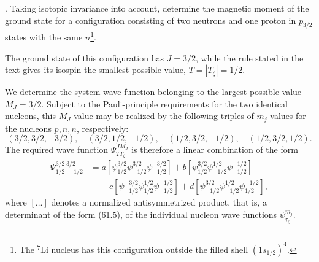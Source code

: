 . Taking isotopic invariance into account, determine the
magnetic moment of the ground state for a configuration consisting of two
neutrons and one proton in $p_{3/2}$ states with the same
$n$\footnote{The ${}^{7}\mathrm{Li}$ nucleus has this configuration outside
the filled shell $(1s_{1/2})^4$.}.

\SolutionHeading The ground state of this configuration has
$J=3/2$, while the rule stated in the text gives its isospin the smallest
possible value, $T=|T_\zeta|=1/2$.

We determine the system wave function belonging to the largest possible value
$M_J=3/2$. Subject to the Pauli-principle requirements for the two identical
nucleons, this $M_J$ value may be realized by the following triples of $m_j$
values for the nucleons $p,n,n$, respectively:
\[
 (3/2,3/2,-3/2),\quad(3/2,1/2,-1/2),\quad
 (1/2,3/2,-1/2),\quad(1/2,3/2,1/2).
\]
The required wave function $\Psi^{JM_J}_{TT_\zeta}$ is therefore a linear
combination of the form
\begin{equation}
 \begin{split}
 \Psi^{3/2\;3/2}_{1/2\;-1/2}
 &=a[\psi^{3/2}_{1/2}\psi^{3/2}_{-1/2}\psi^{-3/2}_{-1/2}]
 +b[\psi^{3/2}_{1/2}\psi^{1/2}_{-1/2}\psi^{-1/2}_{-1/2}]\\
 &\quad+c[\psi^{-3/2}_{-1/2}\psi^{1/2}_{1/2}\psi^{-1/2}_{-1/2}]
 +d[\psi^{3/2}_{-1/2}\psi^{1/2}_{-1/2}\psi^{-1/2}_{1/2}],
 \end{split}
 \tag{1}
\end{equation}
where $[\ldots]$ denotes a normalized antisymmetrized product, that is, a
determinant of the form (61.5), of the individual nucleon wave functions
$\psi^{m_j}_{\tau_\zeta}$.

